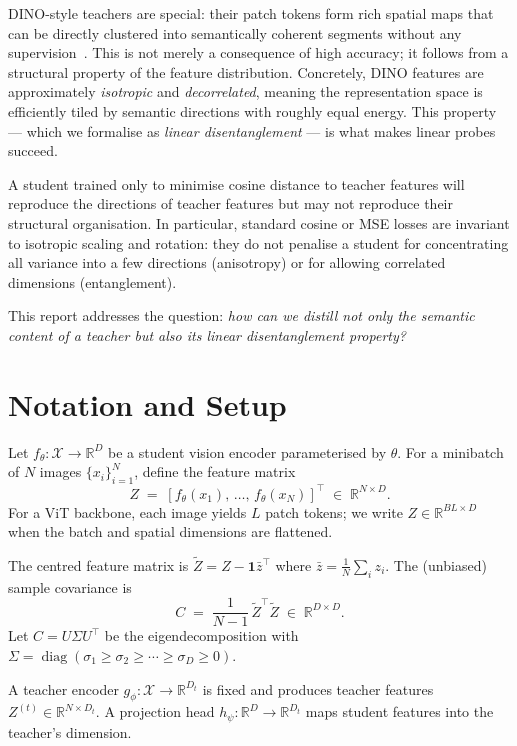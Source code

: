 \documentclass[11pt,a4paper]{article}
\newcommand{\R}{\mathbb{R}}
\newcommand{\calX}{\mathcal{X}}
\newcommand{\diag}{\operatorname{diag}}
\begin{document}
DINO-style teachers are special: their patch tokens form rich spatial maps that
can be directly clustered into semantically coherent segments without any
supervision~\citep{caron2021emerging}.
This is not merely a consequence of high accuracy; it follows from a structural
property of the feature distribution.
Concretely, DINO features are approximately \emph{isotropic} and
\emph{decorrelated}, meaning the representation space is efficiently tiled by
semantic directions with roughly equal energy.
This property — which we formalise as \emph{linear disentanglement} — is what
makes linear probes succeed.

A student trained only to minimise cosine distance to teacher features will
reproduce the directions of teacher features but may not reproduce their
structural organisation.
In particular, standard cosine or MSE losses are invariant to isotropic scaling
and rotation: they do not penalise a student for concentrating all variance into
a few directions (anisotropy) or for allowing correlated dimensions
(entanglement).

This report addresses the question: \textit{how can we distill not only the
semantic content of a teacher but also its linear disentanglement property?}

\section{Notation and Setup}
\label{sec:notation}

Let $f_\theta : \calX \to \R^D$ be a student vision encoder parameterised by
$\theta$.  For a minibatch of $N$ images $\{x_i\}_{i=1}^N$, define the feature
matrix
\[
    Z \;=\; [f_\theta(x_1),\, \ldots,\, f_\theta(x_N)]^\top \;\in\; \R^{N \times D}.
\]
For a ViT backbone, each image yields $L$ patch tokens; we write
$Z \in \R^{B L \times D}$ when the batch and spatial dimensions are flattened.

The centred feature matrix is $\tilde{Z} = Z - \mathbf{1}\bar{z}^\top$ where
$\bar{z} = \frac{1}{N}\sum_i z_i$.  The (unbiased) sample covariance is
\[
    C \;=\; \frac{1}{N-1}\,\tilde{Z}^\top \tilde{Z} \;\in\; \R^{D \times D}.
\]
Let $C = U \Sigma U^\top$ be the eigendecomposition with
$\Sigma = \diag(\sigma_1 \ge \sigma_2 \ge \cdots \ge \sigma_D \ge 0)$.

A teacher encoder $g_\phi : \calX \to \R^{D_t}$ is fixed and produces teacher
features $Z^{(t)} \in \R^{N \times D_t}$.  A projection head
$h_\psi : \R^D \to \R^{D_t}$ maps student features into the teacher's dimension.
\end{document}
